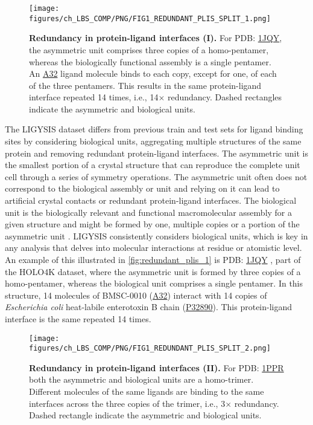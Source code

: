 \begin{figure}[htb!]
    \centering
    \texttt{[image: figures/ch\_LBS\_COMP/PNG/FIG1\_REDUNDANT\_PLIS\_SPLIT\_1.png]}
    \caption[Redundancy in protein-ligand interfaces (I)]{\textbf{Redundancy in protein-ligand interfaces (I).} For PDB: \href{https://www.ebi.ac.uk/pdbe/entry/pdb/1jqy}{1JQY}, the asymmetric unit comprises three copies of a homo-pentamer, whereas the biologically functional assembly is a single pentamer. An \href{https://www.ebi.ac.uk/pdbe-srv/pdbechem/chemicalCompound/show/A32}{A32} ligand molecule binds to each copy, except for one, of each of the three pentamers. This results in the same protein-ligand interface repeated 14 times, i.e., 14$\times$ redundancy. Dashed rectangles indicate the asymmetric and biological units.}
    \label{fig:redundant_plis_1}
\end{figure}

The LIGYSIS dataset differs from previous train and test sets for ligand binding sites by considering biological units, aggregating multiple structures of the same protein and removing redundant protein-ligand interfaces. The asymmetric unit is the smallest portion of a crystal structure that can reproduce the complete unit cell through a series of symmetry operations. The asymmetric unit often does not correspond to the biological assembly or unit and relying on it can lead to artificial crystal contacts or redundant protein-ligand interfaces. The biological unit is the biologically relevant and functional macromolecular assembly for a given structure and might be formed by one, multiple copies or a portion of the asymmetric unit \cite{XU_2019_ASSEMBLIES}. LIGYSIS consistently considers biological units, which is key in any analysis that delves into molecular interactions at residue or atomistic level. An example of this illustrated in \autoref{fig:redundant_plis_1} is PDB: \href{https://www.ebi.ac.uk/pdbe/entry/pdb/1jqy}{1JQY} \cite{PICKENS_2002_ANCHOR}, part of the HOLO4K dataset, where the asymmetric unit is formed by three copies of a homo-pentamer, whereas the biological unit comprises a single pentamer. In this structure, 14 molecules of BMSC-0010 (\href{https://www.rcsb.org/ligand/A32}{A32}) interact with 14 copies of \textit{Escherichia coli} heat-labile enterotoxin B chain (\href{https://www.uniprot.org/uniprotkb/P32890/entry}{P32890}). This protein-ligand interface is the same repeated 14 times.

\FloatBarrier

\begin{figure}[htb!]
    \centering
    \texttt{[image: figures/ch\_LBS\_COMP/PNG/FIG1\_REDUNDANT\_PLIS\_SPLIT\_2.png]}
    \caption[Redundancy in protein-ligand interfaces (II)]{\textbf{Redundancy in protein-ligand interfaces (II).} For PDB: \href{https://www.ebi.ac.uk/pdbe/entry/pdb/1PPR}{1PPR} both the asymmetric and biological units are a homo-trimer. Different molecules of the same ligands are binding to the same interfaces across the three copies of the trimer, i.e., 3$\times$ redundancy. Dashed rectangle indicate the asymmetric and biological units.}
    \label{fig:redundant_plis_2}
\end{figure}


